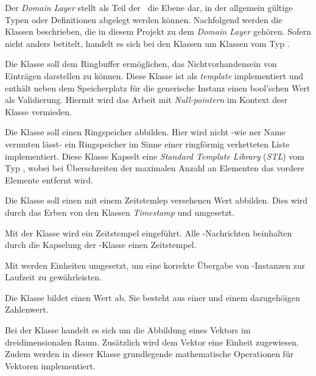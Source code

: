 
Der \textit{Domain Layer} stellt als Teil der \clean\ die Ebene dar, in der allgemein gültige Typen oder Definitionen abgelegt werden können. Nachfolgend werden die Klassen beschrieben, die in diesem Projekt zu dem \textit{Domain Layer} gehören. Sofern nicht anders betitelt, handelt es sich bei den Klassen um Klassen vom Typ \VO.


Die Klasse  soll dem Ringbuffer ermöglichen, das Nichtvorhandensein von Einträgen darstellen zu können. Diese Klasse ist als \textit{template} implementiert und enthält neben dem Speicherplatz für die generische Instanz einen bool'schen Wert als Validierung.
Hiermit wird das Arbeit mit \textit{Null-pointern} im Kontext desr Klasse  vermieden.


Die Klasse  soll einen Ringspeicher abbilden. Hier wird nicht -wie ner Name vermuten lässt- ein Ringspeicher im Sinne einer ringförmig verketteten Liste implementiert. Diese Klasse Kapselt eine \textit{Standard Template Library} (\textit{STL}) vom Typ , wobei bei Überschreiten der maximalen Anzahl an Elementen das vordere Elemente entfernt wird.\\


Die Klasse  soll einen mit einem Zeitstemlep versehenen Wert abbilden. Dies wird durch das Erben von den Klassen \textit{Timestamp} und  umgesetzt.


Mit der Klasse  wird ein Zeitstempel eingeführt. Alle \ROS-Nachrichten beinhalten durch die Kapselung der -Klasse einen Zeitstempel.


Mit  werden Einheiten umgesetzt, um eine korrekte Übergabe von -Instanzen zur Laufzeit zu gewährleisten.


Die Klasse  bildet einen Wert ab. Sie besteht aus einer  und einem dazugehöigen Zahlenwert.


Bei der Klasse  handelt es sich um die Abbildung eines Vektors im dreidimensionalen Raum. Zusätzlich wird dem Vektor eine Einheit zugewiesen.
Zudem werden in dieser Klasse grundlegende mathematische Operationen für Vektoren implementiert.


